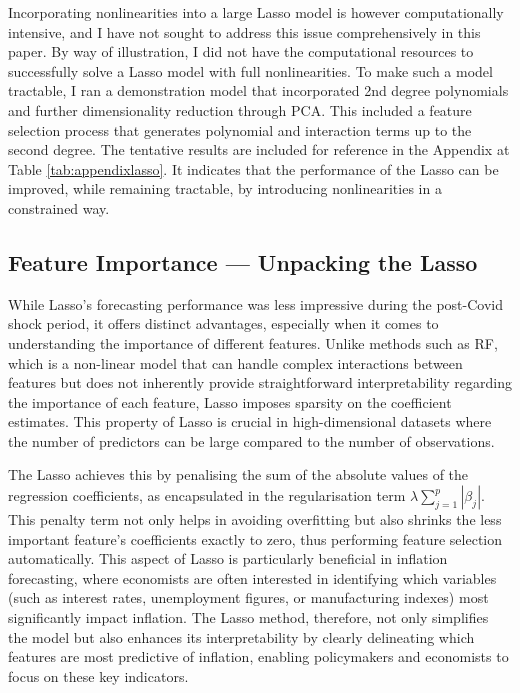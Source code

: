 Incorporating nonlinearities into a large Lasso model is however computationally intensive, and I have not sought to address this issue comprehensively in this paper. By way of illustration, I did not have the computational resources to successfully solve a Lasso model with full nonlinearities. To make such a model tractable, I ran a demonstration model that incorporated 2nd degree polynomials and further dimensionality reduction through PCA. This included a feature selection process that generates polynomial and interaction terms up to the second degree. The tentative results are included for reference in the Appendix at Table \ref{tab:appendixlasso}. It indicates that the performance of the Lasso can be improved, while remaining tractable, by introducing nonlinearities in a constrained way.

\subsection{Feature Importance — Unpacking the Lasso} \label{sec:analysis_lasso}

While Lasso's forecasting performance was less impressive during the post-Covid shock period, it offers distinct advantages, especially when it comes to understanding the importance of different features. Unlike methods such as RF, which is a non-linear model that can handle complex interactions between features but does not inherently provide straightforward interpretability regarding the importance of each feature, Lasso imposes sparsity on the coefficient estimates. This property of Lasso is crucial in high-dimensional datasets where the number of predictors can be large compared to the number of observations.

The Lasso achieves this by penalising the sum of the absolute values of the regression coefficients, as encapsulated in the regularisation term $\lambda \sum_{j=1}^p |\beta_j|$. This penalty term not only helps in avoiding overfitting but also shrinks the less important feature's coefficients exactly to zero, thus performing feature selection automatically. This aspect of Lasso is particularly beneficial in inflation forecasting, where economists are often interested in identifying which variables (such as interest rates, unemployment figures, or manufacturing indexes) most significantly impact inflation. The Lasso method, therefore, not only simplifies the model but also enhances its interpretability by clearly delineating which features are most predictive of inflation, enabling policymakers and economists to focus on these key indicators.

